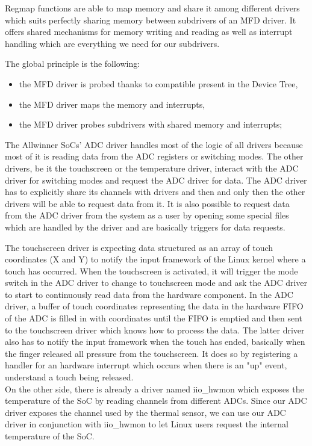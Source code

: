 Regmap functions are able to map memory and share it among different drivers which suits perfectly sharing memory between subdrivers of an MFD driver. It offers shared mechanisms for memory writing and reading as well as interrupt handling which are everything we need for our subdrivers.

The global principle is the following:

\begin{itemize}
  \item the MFD driver is probed thanks to compatible present in the Device Tree,
  \item the MFD driver maps the memory and interrupts,
  \item the MFD driver probes subdrivers with shared memory and interrupts;
\end{itemize}

The Allwinner SoCs' ADC driver handles most of the logic of all drivers because most of it is reading data from the ADC registers or switching modes. The other drivers, be it the touchscreen or the temperature driver, interact with the ADC driver for switching modes and request the ADC driver for data. The ADC driver has to explicitly share its channels with drivers and then and only then the other drivers will be able to request data from it. It is also possible to request data from the ADC driver from the system as a user by opening some special files which are handled by the driver and are basically triggers for data requests.

The touchscreen driver is expecting data structured as an array of touch coordinates (X and Y) to notify the input framework of the Linux kernel where a touch has occurred. When the touchscreen is activated, it will trigger the mode switch in the ADC driver to change to touchscreen mode and ask the ADC driver to start to continuously read data from the hardware component. In the ADC driver, a buffer of touch coordinates representing the data in the hardware FIFO of the ADC is filled in with coordinates until the FIFO is emptied and then sent to the touchscreen driver which knows how to process the data. The latter driver also has to notify the input framework when the touch has ended, basically when the finger released all pressure from the touchscreen. It does so by registering a handler for an hardware interrupt which occurs when there is an "up" event, understand a touch being released.\\
On the other side, there is already a driver named iio\_hwmon which exposes the temperature of the SoC by reading channels from different ADCs. Since our ADC driver exposes the channel used by the thermal sensor, we can use our ADC driver in conjunction with iio\_hwmon to let Linux users request the internal temperature of the SoC.

